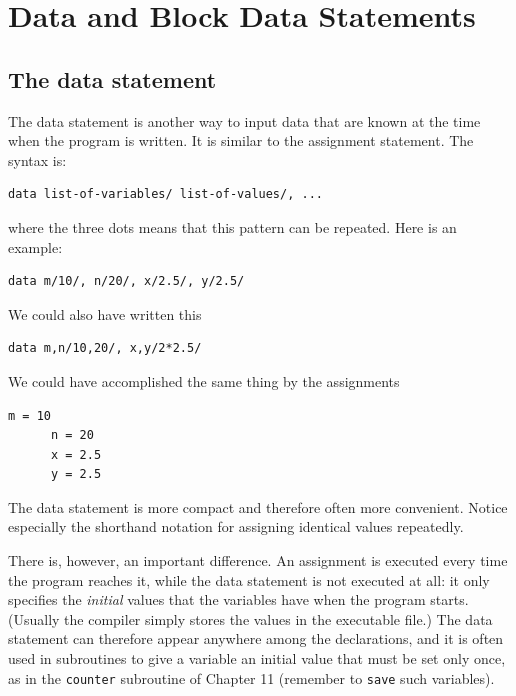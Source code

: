 \chapter{Data and Block Data Statements}

\section{The data statement}

The data statement is another way to input data that are known at the time when the program is written. It is similar to the assignment statement. The syntax is:

\begin{lstlisting}[style=fortran77]
      data list-of-variables/ list-of-values/, ...
\end{lstlisting}

where the three dots means that this pattern can be repeated. Here is an example:

\begin{lstlisting}[style=fortran77]
      data m/10/, n/20/, x/2.5/, y/2.5/
\end{lstlisting}

We could also have written this

\begin{lstlisting}[style=fortran77]
      data m,n/10,20/, x,y/2*2.5/
\end{lstlisting}

We could have accomplished the same thing by the assignments

\begin{lstlisting}[style=fortran77]
      m = 10
      n = 20
      x = 2.5
      y = 2.5
\end{lstlisting}

The data statement is more compact and therefore often more convenient. Notice especially the shorthand notation for assigning identical values repeatedly.

There is, however, an important difference. An assignment is executed every time the program reaches it, while the data statement is not executed at all: it only specifies the \emph{initial} values that the variables have when the program starts. (Usually the compiler simply stores the values in the executable file.) The data statement can therefore appear anywhere among the declarations, and it is often used in subroutines to give a variable an initial value that must be set only once, as in the \texttt{counter} subroutine of Chapter 11 (remember to \texttt{save} such variables).

